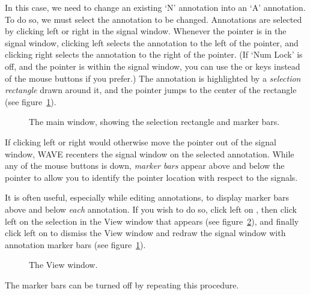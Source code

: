 \documentclass[twoside]{book}
\newcommand{\keycap}[1]{\cornersize{.5}\Ovalbox{\small\sf #1}}
\newcommand{\button}[1]{\cornersize{2}\ovalbox{\rule[-.3mm]{0cm}{2.5mm}\small\sf ~#1~}}
\newcommand{\WAVE}{{\sf WAVE}\xspace}
\begin{document}
\begin{htmlonly}
\end{htmlonly}
\begin{latexonly}
\end{latexonly}
In this case, we need to change an existing `{\sf N}' annotation into
an `{\sf A}' annotation.  To do so, we must select the annotation to
be changed.
Annotations are selected by clicking left or right in the
signal window.  Whenever the pointer is in the signal window, clicking
left selects the annotation to the left of the pointer, and clicking
right selects the annotation to the right of the pointer.  (If `Num
Lock' is off, and the pointer is within the signal window, you can use
the \keycap{$\leftarrow$} or \keycap{$\rightarrow$} keys
instead of the mouse buttons if you prefer.)  The annotation is highlighted by
a \emph{selection rectangle}
drawn around it, and the pointer jumps to
the center of the rectangle (see figure~\ref{fig:main-with-markers}).
\begin{figure}
\centerline{}
\caption{The main window, showing the selection rectangle and marker bars.}
\begin{htmlonly}
\end{htmlonly}
\begin{latexonly}
\end{latexonly}
\label{fig:main-with-markers}
\end{figure}
If clicking left or right would otherwise move the pointer out of the signal
window, \WAVE{} recenters the signal window on the selected annotation.
While any of the mouse buttons is down, \emph{marker bars}
appear above and
below the pointer to allow you to identify the pointer location with respect to
the signals.

It is often useful, especially while editing annotations, to display marker
bars above and below \emph{each} annotation.  If you wish to do so, click left
on \button{View...}, then click left on the \keycap{markers} selection
in the {\sf View} window that appears (see
figure~\ref{fig:view-window}), and finally click left on
\button{Redraw} to dismiss the {\sf View} window and redraw the signal window
with annotation marker bars (see figure~\ref{fig:main-with-markers}).
\begin{figure}
\centerline{}
\caption{The {\sf View} window.}
\label{fig:view-window}
\begin{htmlonly}
\end{htmlonly}
\begin{latexonly}
\end{latexonly}
\end{figure}
The marker bars can be turned off by repeating this procedure.
\end{document}
